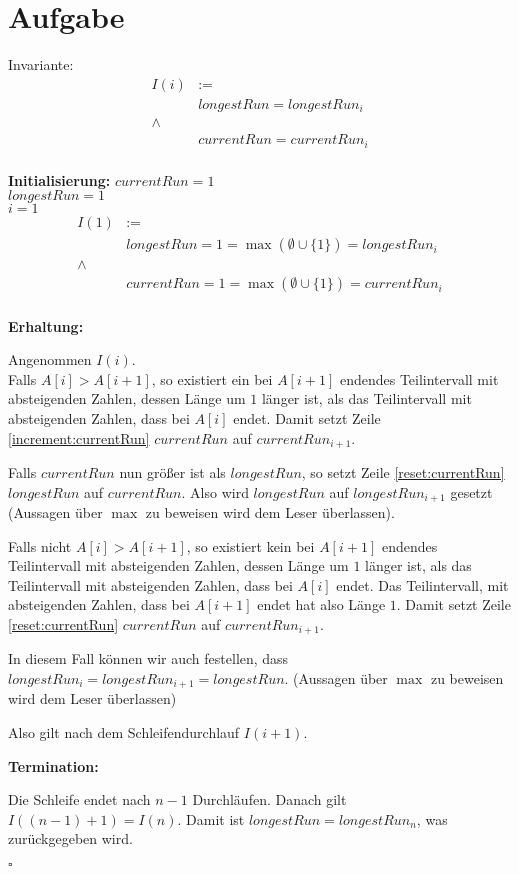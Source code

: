 \documentclass{article}
\newcounter{AufgabenCounter}
\newcounter{TeilaufgabenCounter}
\newenvironment{aufgabe}{\section*{Aufgabe \theAufgabenCounter}\setcounter{TeilaufgabenCounter}{1}}{\stepcounter{AufgabenCounter}}
\newcommand{\qed}{\hfill$\square$}
\begin{document}
\begin{aufgabe}
  Invariante:
  $$\begin{aligned}
      I(i) & :=                      \\
           & longestRun=longestRun_i \\
      \land                          \\
           & currentRun=currentRun_i \\
    \end{aligned}$$

  \textbf{Initialisierung:}
  $currentRun=1$\\
  $longestRun=1$\\
  $i=1$
  $$\begin{aligned}
      I(1) & :=                                                       \\
           & longestRun = 1 = \max(\emptyset\cup\{1\}) = longestRun_i \\
      \land                                                           \\
           & currentRun = 1 = \max(\emptyset\cup\{1\}) = currentRun_i \\
    \end{aligned}$$

  \textbf{Erhaltung:}

  Angenommen $I(i)$. \\
  Falls $A[i] > A[i+1]$, so existiert ein bei $A[i+1]$ endendes Teilintervall mit absteigenden Zahlen,
  dessen Länge um $1$ länger ist, als das Teilintervall mit absteigenden Zahlen, dass bei $A[i]$ endet.
  Damit setzt Zeile \ref{increment:currentRun} $currentRun$ auf $currentRun_{i+1}$.

  Falls $currentRun$ nun größer ist als $longestRun$, so setzt Zeile \ref{reset:currentRun} $longestRun$ auf $currentRun$.
  Also wird $longestRun$ auf $longestRun_{i+1}$ gesetzt (Aussagen über $\max$ zu beweisen wird dem Leser überlassen).

  Falls nicht $A[i] > A[i+1]$, so existiert kein bei $A[i+1]$ endendes Teilintervall mit absteigenden Zahlen,
  dessen Länge um $1$ länger ist, als das Teilintervall mit absteigenden Zahlen, dass bei $A[i]$ endet. Das Teilintervall,
  mit absteigenden Zahlen, dass bei $A[i+1]$ endet hat also Länge $1$. Damit setzt Zeile \ref{reset:currentRun} $currentRun$ auf $currentRun_{i+1}$.

  In diesem Fall können wir auch festellen, dass $longestRun_i = longestRun_{i+1} = longestRun$.
  (Aussagen über $\max$ zu beweisen wird dem Leser überlassen)

  Also gilt nach dem Schleifendurchlauf $I(i+1)$.

  \textbf{Termination:}

  Die Schleife endet nach $n-1$ Durchläufen.
  Danach gilt $I((n-1)+1) = I(n)$.
  Damit ist $longestRun=longestRun_n$, was zurückgegeben wird.

  \qed

\end{aufgabe}
\end{document}
